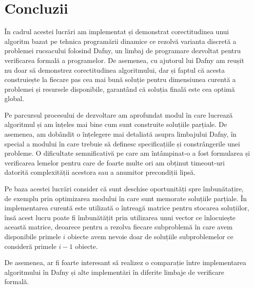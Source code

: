 \chapter*{Concluzii} 

\begin{sloppypar}

În cadrul acestei lucrări am implementat și demonstrat corectitudinea unui algoritm  bazat pe tehnica programării dinamice ce rezolvă varianta discretă a problemei rucsacului folosind Dafny, un limbaj de programare dezvoltat pentru verificarea formală a programelor. De asemenea, cu ajutorul lui Dafny am reușit nu doar să demonstrez corectitudinea algoritmului, dar și faptul că acesta construiește la fiecare pas cea mai bună soluție pentru dimensiunea curentă a problemei și resursele disponibile, garantând că soluția finală este cea optimă global. \par
Pe parcursul procesului de dezvoltare am aprofundat modul în care lucrează algoritmul și am înțeles mai bine cum sunt construite soluțiile parțiale. De asemenea, am dobândit o înțelegere mai detaliată asupra limbajului Dafny, în special a modului în care trebuie să definesc specificațiile și constrângerile unei probleme. O dificultate semnificativă pe care am întâmpinat-o a fost formularea și verificarea lemelor pentru care de foarte multe ori am obținut timeout-uri datorită complexității acestora sau a anumitor precondiții lipsă. \par
Pe baza acestei lucrări consider că sunt deschise oportunități spre  îmbunătațire, de exemplu prin optimizarea modului în care sunt memorate soluțiile parțiale. În implementarea curentă este utilizată o întreagă matrice pentru stocarea soluțiilor, însă acest lucru poate fi îmbunătățit prin utilizarea unui vector ce înlocuiește această matrice, deoarece pentru a rezolva fiecare subproblemă în care avem disponibile primele $i$ obiecte avem nevoie doar de soluțiile subproblemelor ce consideră primele $i - 1$ obiecte. \par
De asemenea, ar fi foarte interesant să realizez o comparație între implementarea algoritmului în Dafny și alte implementări în diferite limbaje de verificare formală.

\end{sloppypar}
